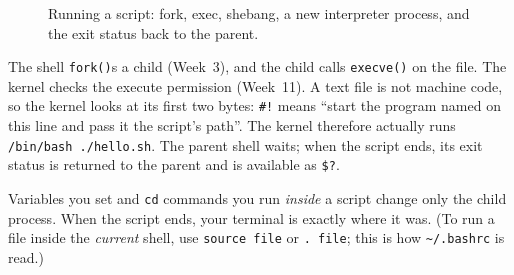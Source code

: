 \documentclass[11pt,a4paper]{article}
\newcommand{\cmd}[1]{\texttt{#1}}
\begin{document}
\begin{figure}[H]
\centering
{}
\caption{Running a script: fork, exec, shebang, a new interpreter process, and the exit status back to the parent.}
\end{figure}

The shell \cmd{fork()}s a child (Week~3), and the child calls \cmd{execve()} on the file. The kernel checks the execute permission (Week~11). A text file is not machine code, so the kernel looks at its first two bytes: \texttt{\#!} means “start the program named on this line and pass it the script's path”. The kernel therefore actually runs \texttt{/bin/bash ./hello.sh}. The parent shell waits; when the script ends, its exit status is returned to the parent and is available as \texttt{\$?}.

\begin{keyidea}
Variables you set and \cmd{cd} commands you run \emph{inside} a script change only the child process. When the script ends, your terminal is exactly where it was. (To run a file inside the \emph{current} shell, use \cmd{source file} or \cmd{. file}; this is how \texttt{\textasciitilde/.bashrc} is read.)
\end{keyidea}
\end{document}
